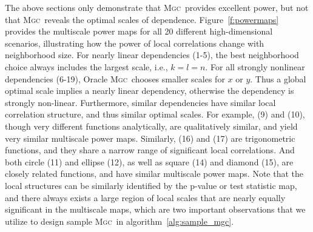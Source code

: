\documentclass[11pt]{article}
\providecommand{\sct}[1]{{\normalfont\textsc{#1}}}
\newcommand{\Mgc}{\sct{Mgc}}
\begin{document}
The above sections only demonstrate that \Mgc~provides excellent power, but not that \Mgc~reveals the optimal scales of dependence. 
Figure~\ref{f:powermaps} provides the multiscale power maps for all 20 different high-dimensional scenarios, illustrating how the power of local correlations change with  neighborhood size.
% 
For nearly linear dependencies (1-5), the best neighborhood choice always includes the largest scale, i.e., $k=l=n$. For all strongly nonlinear dependencies (6-19), Oracle \Mgc~chooses smaller scales for $x$ or $y$. Thus a global optimal scale implies a nearly linear dependency, otherwise the dependency is strongly non-linear.
Furthermore, similar dependencies have similar local correlation structure, and thus similar optimal scales. For example, (9) and (10), though very different functions analytically, are qualitatively similar, and yield very similar multiscale power maps.
Similarly,  (16) and (17) are trigonometric functions, and they share a narrow range of significant local correlations.
And both circle (11) and ellipse (12), as well as square (14) and diamond (15), are closely related functions, and have similar multiscale power maps. 
%
Note that the local structures can be similarly identified by the p-value or test statistic map, and there always exists a large region of local scales that are nearly equally significant in the multiscale maps, which are two important observations that we utilize to design sample \Mgc~in algorithm~\ref{alg:sample_mgc}.
\end{document}

